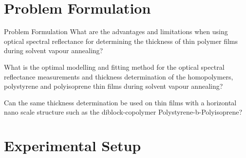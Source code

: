 \documentclass[10pt]{beamer}
\begin{document}
\section{Problem Formulation}
\begin{frame}{Problem Formulation}
What are the advantages and limitations when using optical spectral reflectance for determining the thickness of thin polymer films during solvent vapour annealing?

What is the optimal modelling and fitting method for the optical spectral reflectance measurements and thickness determination of the homopolymers, polystyrene and polyisoprene thin films during solvent vapour annealing?  
		
Can the same thickness determination be used on thin films with a horizontal nano scale structure such as the diblock-copolymer Polystyrene-b-Polyisoprene? 
\end{frame}
	
	
\section{Experimental Setup}
		
\end{document}
